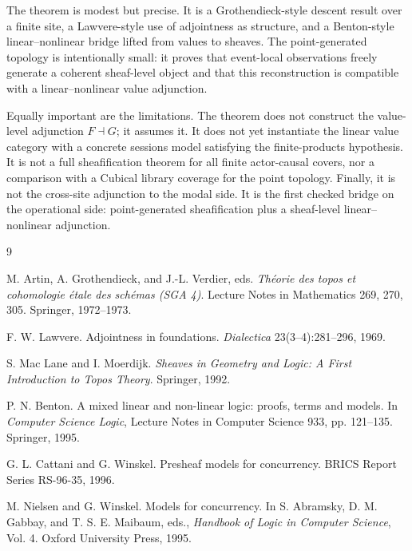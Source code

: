 \documentclass[10pt]{article}
\begin{document}
The theorem is modest but precise.  It is a Grothendieck-style descent result over a finite site, a Lawvere-style use of adjointness as structure, and a Benton-style linear--nonlinear bridge lifted from values to sheaves.  The point-generated topology is intentionally small: it proves that event-local observations freely generate a coherent sheaf-level object and that this reconstruction is compatible with a linear--nonlinear value adjunction.

Equally important are the limitations.  The theorem does not construct the value-level adjunction $F\dashv G$; it assumes it.  It does not yet instantiate the linear value category with a concrete sessions model satisfying the finite-products hypothesis.  It is not a full sheafification theorem for all finite actor-causal covers, nor a comparison with a Cubical library coverage for the point topology.  Finally, it is not the cross-site adjunction to the modal side.  It is the first checked bridge on the operational side: point-generated sheafification plus a sheaf-level linear--nonlinear adjunction.

\begin{thebibliography}{9}

M. Artin, A. Grothendieck, and J.-L. Verdier, eds.
\emph{Th\'eorie des topos et cohomologie \'etale des sch\'emas (SGA 4)}.
Lecture Notes in Mathematics 269, 270, 305. Springer, 1972--1973.

F. W. Lawvere.
Adjointness in foundations.
\emph{Dialectica} 23(3--4):281--296, 1969.

S. Mac Lane and I. Moerdijk.
\emph{Sheaves in Geometry and Logic: A First Introduction to Topos Theory}.
Springer, 1992.

P. N. Benton.
A mixed linear and non-linear logic: proofs, terms and models.
In \emph{Computer Science Logic}, Lecture Notes in Computer Science 933, pp. 121--135. Springer, 1995.

G. L. Cattani and G. Winskel.
Presheaf models for concurrency.
BRICS Report Series RS-96-35, 1996.

M. Nielsen and G. Winskel.
Models for concurrency.
In S. Abramsky, D. M. Gabbay, and T. S. E. Maibaum, eds., \emph{Handbook of Logic in Computer Science}, Vol. 4. Oxford University Press, 1995.

\end{thebibliography}
\end{document}
